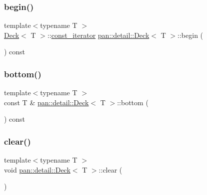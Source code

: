 \subsubsection{\texorpdfstring{begin()}{begin()}\hspace{0.1cm}{\footnotesize\ttfamily [2/2]}}
{\footnotesize\ttfamily template$<$typename T $>$ \\
\hyperlink{classpan_1_1detail_1_1_deck}{Deck}$<$ T $>$\+::\hyperlink{classpan_1_1detail_1_1_deck_addc18d2f40aa396f6358bb019d088728}{const\+\_\+iterator} \hyperlink{classpan_1_1detail_1_1_deck}{pan\+::detail\+::\+Deck}$<$ T $>$\+::begin (\begin{DoxyParamCaption}{ }\end{DoxyParamCaption}) const\hspace{0.3cm}{\ttfamily [inline]}}

\mbox{\label{classpan_1_1detail_1_1_deck_a44054712651d2f78a7c6c238be9dbdcb}} 
\subsubsection{\texorpdfstring{bottom()}{bottom()}}
{\footnotesize\ttfamily template$<$typename T $>$ \\
const T \& \hyperlink{classpan_1_1detail_1_1_deck}{pan\+::detail\+::\+Deck}$<$ T $>$\+::bottom (\begin{DoxyParamCaption}{ }\end{DoxyParamCaption}) const\hspace{0.3cm}{\ttfamily [inline]}}

\mbox{\label{classpan_1_1detail_1_1_deck_afbcc141b70fe8cf56f66b1e4d11bd4f4}} 
\subsubsection{\texorpdfstring{clear()}{clear()}}
{\footnotesize\ttfamily template$<$typename T $>$ \\
void \hyperlink{classpan_1_1detail_1_1_deck}{pan\+::detail\+::\+Deck}$<$ T $>$\+::clear (\begin{DoxyParamCaption}{ }\end{DoxyParamCaption})\hspace{0.3cm}{\ttfamily [inline]}}

